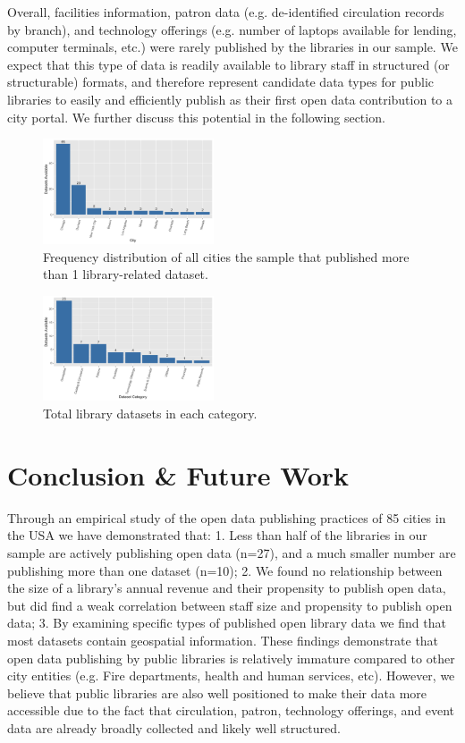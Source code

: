 \documentclass[sigconf]{acmart}
\begin{document}
Overall, facilities information, patron data (e.g. de-identified circulation records by branch), and technology offerings (e.g. number of laptops available for lending, computer terminals, etc.) were rarely published by the libraries in our sample. We expect that this type of data is readily available to library staff in structured (or structurable) formats, and therefore represent candidate data types for public libraries to easily and efficiently publish as their first open data contribution to a city portal. We further discuss this potential in the following section.

\begin{figure}
\centering
\includegraphics[width=0.45\textwidth]{images/cities_barchart_sorted_morethanone.png}
\caption{\label{fig:categories}Frequency distribution of all cities the sample that published more
than 1 library-related dataset.}
\end{figure}

\begin{figure}
\centering
\includegraphics[width=0.45\textwidth]{images/categories_barchart_sorted.png}
\caption{\label{fig:categories}Total library datasets in each category.}
\end{figure}

\section{Conclusion \& Future Work}
Through an empirical study of the open data publishing practices of 85 cities in the USA we have demonstrated that: 1. Less than half of the libraries in our sample are actively publishing open data (n=27), and a much smaller number are publishing more than one dataset (n=10); 2. We found no relationship between the size of a library's annual revenue and their propensity to publish open data, but did find a weak correlation between staff size and propensity to publish open data; 3. By examining specific types of published open library data we find that most datasets contain geospatial information. These findings demonstrate that open data publishing by public libraries is relatively immature compared to other city entities (e.g. Fire departments, health and human services, etc). However, we believe that public libraries are also well positioned to make their data more accessible due to the fact that circulation, patron, technology offerings, and event data are already broadly collected and likely well structured.
\end{document}
